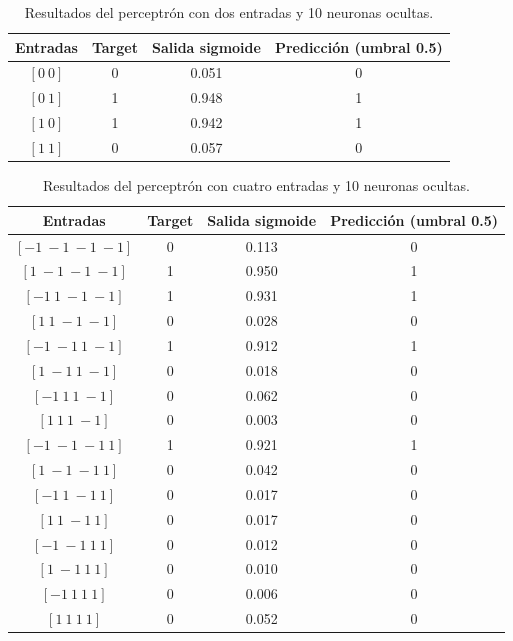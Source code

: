 \documentclass[11pt]{article} %
\begin{document}
\begin{table}[h!]
	\centering
	\begin{tabular}{cccc}
		\hline
		\textbf{Entradas} & \textbf{Target} & \textbf{Salida sigmoide} & \textbf{Predicción (umbral 0.5)} \\
		\hline
		$[0\ 0]$ & 0 & 0.051 & 0 \\
		$[0\ 1]$ & 1 & 0.948 & 1 \\
		$[1\ 0]$ & 1 & 0.942 & 1 \\
		$[1\ 1]$ & 0 & 0.057 & 0 \\
		\hline
	\end{tabular}
	\caption{Resultados del perceptrón con dos entradas y 10 neuronas ocultas.}
\end{table}

\begin{table}[h!]
	\centering
	\begin{tabular}{cccc}
		\hline
		\textbf{Entradas} & \textbf{Target} & \textbf{Salida sigmoide} & \textbf{Predicción (umbral 0.5)} \\
		\hline
		$[-1\ -1\ -1\ -1]$ & 0 & 0.113 & 0 \\
		$[1\ -1\ -1\ -1]$ & 1 & 0.950 & 1 \\
		$[-1\ 1\ -1\ -1]$ & 1 & 0.931 & 1 \\
		$[1\ 1\ -1\ -1]$ & 0 & 0.028 & 0 \\
		$[-1\ -1\ 1\ -1]$ & 1 & 0.912 & 1 \\
		$[1\ -1\ 1\ -1]$ & 0 & 0.018 & 0 \\
		$[-1\ 1\ 1\ -1]$ & 0 & 0.062 & 0 \\
		$[1\ 1\ 1\ -1]$ & 0 & 0.003 & 0 \\
		$[-1\ -1\ -1\ 1]$ & 1 & 0.921 & 1 \\
		$[1\ -1\ -1\ 1]$ & 0 & 0.042 & 0 \\
		$[-1\ 1\ -1\ 1]$ & 0 & 0.017 & 0 \\
		$[1\ 1\ -1\ 1]$ & 0 & 0.017 & 0 \\
		$[-1\ -1\ 1\ 1]$ & 0 & 0.012 & 0 \\
		$[1\ -1\ 1\ 1]$ & 0 & 0.010 & 0 \\
		$[-1\ 1\ 1\ 1]$ & 0 & 0.006 & 0 \\
		$[1\ 1\ 1\ 1]$ & 0 & 0.052 & 0 \\
		\hline
	\end{tabular}
	\caption{Resultados del perceptrón con cuatro entradas y 10 neuronas ocultas.}
\end{table}

\clearpage
\end{document}
